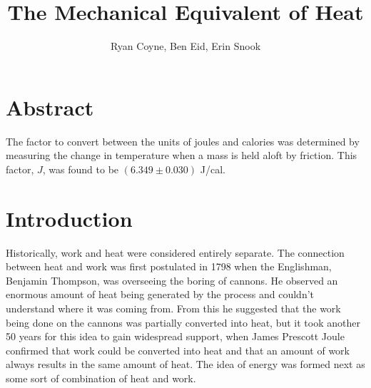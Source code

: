 \documentclass[12pt]{article}
\begin{document}
    \title{The Mechanical Equivalent of Heat}
    \author{Ryan Coyne, Ben Eid, Erin Snook}
    \maketitle

    \section{Abstract}
        The factor to convert between the units of joules and calories was determined by measuring the change in temperature when a mass is held aloft by friction. This factor, \(J\), was found to be \((6.349 \pm 0.030 )\) J/cal.
    \section{Introduction}
        Historically, work and heat were considered entirely separate. The connection between heat and work was first postulated in 1798 when the Englishman, Benjamin Thompson, was overseeing the boring of cannons. He observed an enormous amount of heat being generated by the process and couldn't understand where it was coming from. From this he suggested that the work being done on the cannons was partially converted into heat, but it took another 50 years for this idea to gain widespread support, when James Prescott Joule confirmed that work could be converted into heat and that an amount of work always results in the same amount of heat. The idea of energy was formed next as some sort of combination of heat and work.
\end{document}
